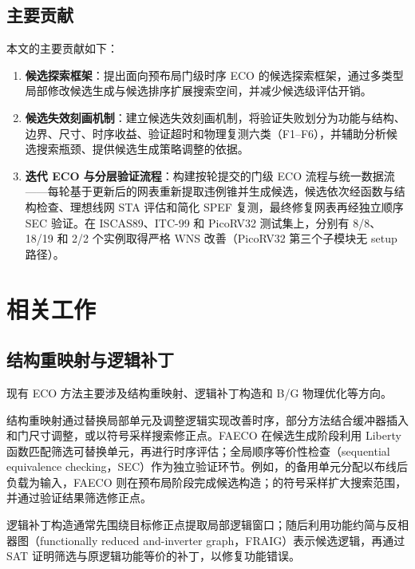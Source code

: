 \documentclass[twocolumn,10pt,fontset=windows]{ctexart}
\begin{document}
\subsection{主要贡献}
本文的主要贡献如下：

\begin{enumerate}
  \item \textbf{候选探索框架}：提出面向预布局门级时序 ECO 的候选探索框架，通过多类型局部修改候选生成与候选排序扩展搜索空间，并减少候选级评估开销。
  \item \textbf{候选失效刻画机制}：建立候选失效刻画机制，将验证失败划分为功能与结构、边界、尺寸、时序收益、验证超时和物理复测六类（F1--F6），并辅助分析候选搜索瓶颈、提供候选生成策略调整的依据。
  \item \textbf{迭代 ECO 与分层验证流程}：构建按轮提交的门级 ECO 流程与统一数据流——每轮基于更新后的网表重新提取违例锥并生成候选，候选依次经函数与结构检查、理想线网 STA 评估和简化 SPEF 复测，最终修复网表再经独立顺序 SEC 验证。在 ISCAS89、ITC-99 和 PicoRV32 测试集上，分别有 8/8、18/19 和 2/2 个实例取得严格 WNS 改善（PicoRV32 第三个子模块无 setup 路径）。
\end{enumerate}

\section{相关工作}

\subsection{结构重映射与逻辑补丁}
现有 ECO 方法主要涉及结构重映射、逻辑补丁构造和 B/G 物理优化等方向。

结构重映射通过替换局部单元及调整逻辑实现改善时序，部分方法结合缓冲器插入和门尺寸调整\cite{ho2010eco}，或以符号采样搜索修正点\cite{kravets2019symbolic}。FAECO 在候选生成阶段利用 Liberty 函数匹配筛选可替换单元，再进行时序评估；全局顺序等价性检查（sequential equivalence checking，SEC）作为独立验证环节。例如，\cite{ho2010eco}的备用单元分配以布线后负载为输入，FAECO 则在预布局阶段完成候选构造；\cite{kravets2019symbolic}的符号采样扩大搜索范围，并通过验证结果筛选修正点。

逻辑补丁构造通常先围绕目标修正点提取局部逻辑窗口；随后利用功能约简与反相器图（functionally reduced and-inverter graph，FRAIG）表示候选逻辑，再通过 SAT 证明筛选与原逻辑功能等价的补丁，以修复功能错误\cite{jiang2010fraig,jiang2016resource}。
\end{document}
